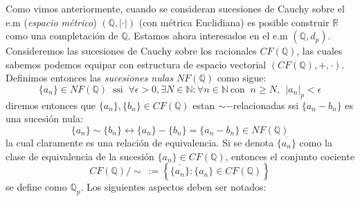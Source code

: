 \documentclass[spanish, fleqn]{article}
\begin{document}
Como vimos anteriormente, cuando se consideran sucesiones de Cauchy sobre el e.m (\textit{espacio métrico}) $(\mathbb{Q}, |\cdot|)$ (con métrica Euclidiana) es posible construir $\mathbb{R}$ como una completación de $\mathbb{Q}$. Estamos ahora interesados en el e.m $(\mathbb{Q}, d_p)$.
\\

Consideremos las sucesiones de Cauchy sobre los racionales $CF(\mathbb{Q})$, las cuales sabemos podemos equipar con estructura de espacio vectorial $(CF(\mathbb{Q}), +, \cdot)$. Definimos entonces las \textit{sucesiones nulas} $NF(\mathbb{Q})$ como sigue:
\begin{equation*}
    \{a_n\} \in NF(\mathbb{Q}) \ \text{ ssi } \ \forall \epsilon>0, \exists N \in \mathbb{N}: \forall n \in \mathbb{N} \ \text{con } \ n \geq N, \ \ |a_n|_p < \epsilon
\end{equation*}
diremos entonces que $\{a_n\}, \{b_n\} \in CF(\mathbb{Q})$ estan $\sim -$relacionadas ssi $\{a_n - b_n \}$ es una sucesión nula:
\begin{equation*}
    \{a_n\} \sim \{b_n\} \leftrightarrow \{a_n\}-\{b_n\}=\{a_n-b_n\} \in NF(\mathbb{Q})
\end{equation*}
la cual claramente es una relación de equivalencia. Si se denota $\overline{\{a_n\}}$ como la clase de equivalencia de la sucesión $\{a_n\} \in CF(\mathbb{Q})$, entonces el conjunto cociente
\begin{equation*}
    CF(\mathbb{Q})/\sim \ := \left\{ \overline{\{a_n\}}: \{a_n\} \in CF(\mathbb{Q}) \right\}
\end{equation*}
se define como $\mathbb{Q}_p$. Los siguientes aspectos deben ser notados:
\end{document}
